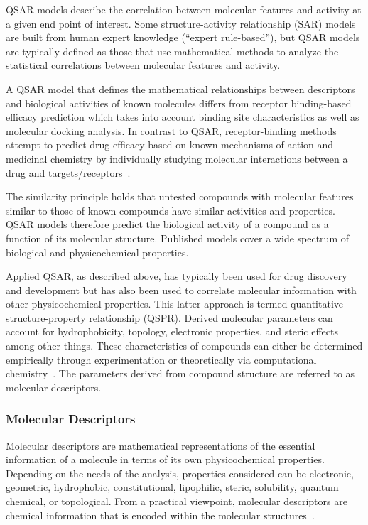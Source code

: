 QSAR models describe the correlation between molecular features and activity at a given end point of interest. Some structure-activity relationship (SAR) models are built from human expert knowledge (``expert rule-based''), but QSAR models are typically defined as those that use mathematical methods to analyze the statistical correlations between molecular features and activity. 

A QSAR model that defines the mathematical relationships between descriptors and biological activities of known molecules differs from receptor binding-based efficacy prediction which takes into account binding site characteristics as well as molecular docking analysis. In contrast to QSAR, receptor-binding methods attempt to predict drug efficacy based on known mechanisms of action and medicinal chemistry by individually studying molecular interactions between a drug and targets/receptors~\cite{Kruhlak2012}.

The similarity principle holds that untested compounds with molecular features similar to those of known compounds have similar activities and properties. QSAR models therefore predict the biological activity of a compound as a function of its molecular structure. Published models cover a wide spectrum of biological and physicochemical properties.

Applied QSAR, as described above, has typically been used for drug discovery and development but has also been used to correlate molecular information with other physicochemical properties. This latter approach is termed quantitative structure-property relationship (QSPR). Derived molecular parameters can account for hydrophobicity, topology, electronic properties, and steric effects among other things. These characteristics of compounds can either be determined empirically through experimentation or theoretically via computational chemistry~\cite{Nantasenamat2009}. The parameters derived from compound structure are referred to as molecular descriptors.

\subsubsection{Molecular Descriptors}
Molecular descriptors are mathematical representations of the essential information of a molecule in terms of its own physicochemical properties. Depending on the needs of the analysis, properties considered can be electronic, geometric, hydrophobic, constitutional, lipophilic, steric, solubility, quantum chemical, or topological. From a practical viewpoint, molecular descriptors are chemical information that is encoded within the molecular structures~\cite{Nantasenamat2009}.

